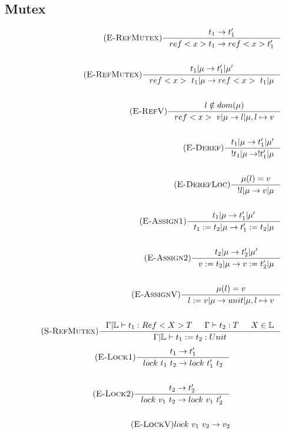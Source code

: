 \documentclass[12pt]{article}
\def\lock {\mathbb{L}}
\begin{document}
\subsection{Mutex}
\begin{align*}
    \tag {\textsc{E-RefMutex}}
    \inference[]{t_1->t_1'}{ref<x> t_1 -> ref<x> t_1'}
    \\
    \\
    \tag {\textsc{E-RefMutex}}
    \inference[]{t_1|\mu->t_1'|\mu '}{ref<x>~t_1|\mu -> ref<x>~t_1|\mu}
    \\
    \\
    \tag {\textsc{E-RefV}}
    \inference[]{l\notin dom(\mu)}{ref<x>~v|\mu -> l|\mu,l\mapsto v}
    \\
    \\
    \tag {\textsc{E-Deref}}
    \inference[]{t_1|\mu->t_1'|\mu '}{!t_1|\mu -> !t_1'|\mu}
    \\
    \\
    \tag {\textsc{E-DerefLoc}}
    \inference[]{\mu(l)=v}{!l|\mu -> v|\mu}
    \\
    \\
    \tag {\textsc{E-Assign1}}
    \inference[]{t_1|\mu->t_1'|\mu '}{t_1:=t_2|\mu -> t_1':=t_2|\mu}
    \\
    \\
    \tag {\textsc{E-Assign2}}
    \inference[]{t_2|\mu->t_2'|\mu '}{v:=t_2|\mu -> v:=t_2'|\mu}
    \\
    \\
    \tag {\textsc{E-AssignV}}
    \inference[]{\mu(l)=v}{l:=v|\mu -> unit|\mu,l\mapsto v}
    \\
    \\
    \tag {\textsc{S-RefMutex}}
    \inference[]{\Gamma|\lock \vdash t_1:Ref<X>T & \Gamma \vdash t_2:T & X\in \lock}{\Gamma|\lock\vdash t_1 := t_2:Unit}
\end{align*}
\begin{align*}
    \tag{\textsc{E-Lock1}}
    \inference[]{t_1->t_1'}{lock~t_1~t_2 -> lock~t_1'~t_2}
    \\
    \\
    \tag{\textsc{E-Lock2}}
    \inference[]{t_2->t_2'}{lock~v_1~t_2 -> lock~v_1~t_2'}
    \\
    \\
    \tag{\textsc{E-LockV}}lock~v_1~v_2 -> v_2
    \end{align*}
    
\end{document}

